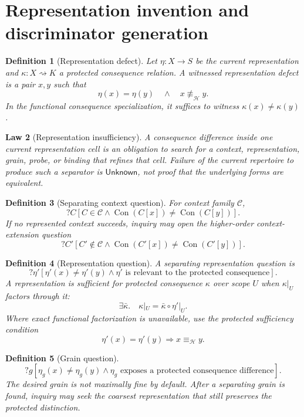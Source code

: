 \documentclass[11pt,oneside]{article}
\newtheorem{definition}{Definition}[section]
\newtheorem{law}[definition]{Law}
\newcommand{\Con}{\operatorname{Con}}
\begin{document}
\section{Representation invention and discriminator generation}

\begin{definition}[Representation defect]
Let \(\eta:X\to S\) be the current representation and \(\kappa:X\rightsquigarrow K\) a protected consequence relation.  A witnessed representation defect is a pair \(x,y\) such that
\[
\boxed{
\eta(x)=\eta(y)
\quad\land\quad
x\not\equiv_{\mathcal H}y.
}
\]
In the functional consequence specialization, it suffices to witness \(\kappa(x)\neq\kappa(y)\).
\end{definition}

\begin{law}[Representation insufficiency]
A consequence difference inside one current representation cell is an obligation to search for a context, representation, grain, probe, or binding that refines that cell.  Failure of the current repertoire to produce such a separator is \(\mathsf{Unknown}\), not proof that the underlying forms are equivalent.
\end{law}

\begin{definition}[Separating context question]
For context family \(\mathcal C\),
\[
\boxed{
?C[
C\in\mathcal C
\land
\Con(C[x])\neq\Con(C[y])
].
}
\]
If no represented context succeeds, inquiry may open the higher-order context-extension question
\[
?C'[
C'\notin\mathcal C
\land
\Con(C'[x])\neq\Con(C'[y])
].
\]
\end{definition}

\begin{definition}[Representation question]
A separating representation question is
\[
\boxed{
?\eta'[
\eta'(x)\neq\eta'(y)
\land
\eta'\text{ is relevant to the protected consequence}
].
}
\]
A representation is sufficient for protected consequence \(\kappa\) over scope \(U\) when \(\kappa|_U\) factors through it:
\[
\boxed{
\exists \bar\kappa.\quad
\kappa|_U=\bar\kappa\circ\eta'|_U.
}
\]
Where exact functional factorization is unavailable, use the protected sufficiency condition
\[
\eta'(x)=\eta'(y)\Longrightarrow x\equiv_{\mathcal H}y.
\]
\end{definition}

\begin{definition}[Grain question]
\[
\boxed{
?g[
\eta_g(x)\neq\eta_g(y)
\land
\eta_g\text{ exposes a protected consequence difference}
].
}
\]
The desired grain is not maximally fine by default.  After a separating grain is found, inquiry may seek the coarsest representation that still preserves the protected distinction.
\end{definition}
\end{document}
